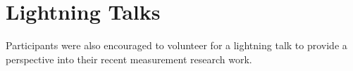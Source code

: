 \section{Lightning Talks}\label{sec:lightning-talks}

Participants were also encouraged to volunteer for a lightning talk to provide
a perspective into their recent measurement research work.

